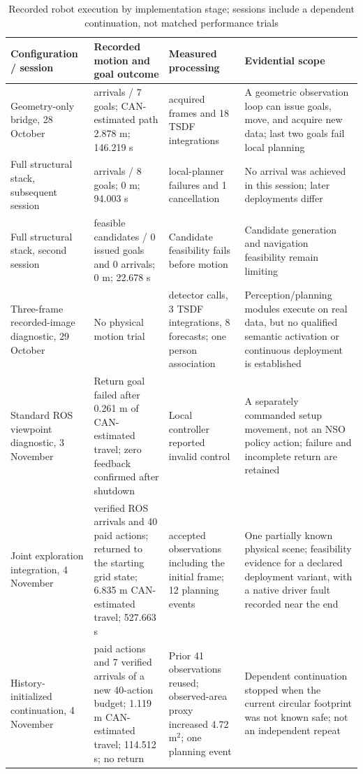 \documentclass[11pt,a4paper]{article}
\newlength{\JournalTableWidth}
\begin{document}
\begin{table}[!htbp]
\caption{Recorded robot execution by implementation stage; sessions include a dependent continuation, not matched performance trials}\label{tab:7}
\small\renewcommand{\arraystretch}{1.12}\setlength{\tabcolsep}{3pt}
\setlength{\JournalTableWidth}{\dimexpr\linewidth-6\tabcolsep\relax}
\begin{tabular}{@{}>{\raggedright\arraybackslash}p{0.22\JournalTableWidth} >{\raggedright\arraybackslash}p{0.24\JournalTableWidth} >{\raggedright\arraybackslash}p{0.24\JournalTableWidth} >{\raggedright\arraybackslash}p{0.3\JournalTableWidth}@{}}
\toprule
Configuration / session & Recorded motion and goal outcome & Measured processing & Evidential scope \\
\midrule
Geometry-only bridge, 28 October & 5 arrivals / 7 goals; CAN-estimated path 2.878 m; 146.219 s & 18 acquired frames and 18 TSDF integrations & A geometric observation loop can issue goals, move, and acquire new data; last two goals fail local planning \\
Full structural stack, subsequent session & 0 arrivals / 8 goals; 0 m; 94.003 s & 7 local-planner failures and 1 cancellation & No arrival was achieved in this session; later deployments differ \\
Full structural stack, second session & 0 feasible candidates / 0 issued goals and 0 arrivals; 0 m; 22.678 s & Candidate feasibility fails before motion & Candidate generation and navigation feasibility remain limiting \\
Three-frame recorded-image diagnostic, 29 October & No physical motion trial & 3 detector calls, 3 TSDF integrations, 8 forecasts; one person association & Perception/planning modules execute on real data, but no qualified semantic activation or continuous deployment is established \\
Standard ROS viewpoint diagnostic, 3 November & Return goal failed after 0.261 m of CAN-estimated travel; zero feedback confirmed after shutdown & Local controller reported invalid control & A separately commanded setup movement, not an NSO policy action; failure and incomplete return are retained \\
Joint exploration integration, 4 November & 40 verified ROS arrivals and 40 paid actions; returned to the starting grid state; 6.835 m CAN-estimated travel; 527.663 s & 41 accepted observations including the initial frame; 12 planning events & One partially known physical scene; feasibility evidence for a declared deployment variant, with a native driver fault recorded near the end \\
History-initialized continuation, 4 November & 7 paid actions and 7 verified arrivals of a new 40-action budget; 1.119 m CAN-estimated travel; 114.512 s; no return & Prior 41 observations reused; observed-area proxy increased 4.72 m$^2$; one planning event & Dependent continuation stopped when the current circular footprint was not known safe; not an independent repeat \\
\bottomrule
\end{tabular}
\end{table}
\end{document}
